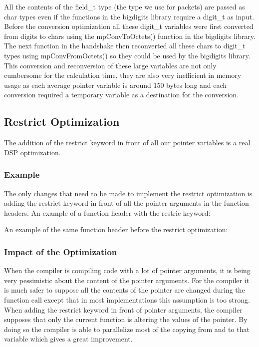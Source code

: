 \documentclass[a4paper]{article}
\begin{document}
All the contents of the field\_t type (the type we use for packets) are passed as char types even if the functions in the bigdigits library require a digit\_t as input. Before the conversion optimization all these digit\_t variables were first converted from digits to chars using the mpConvToOctets() function in the bigdigits library. The next function in the handshake then reconverted all these chars to digit\_t types using mpConvFromOctets() so they could be used by the bigdigits library.\\

This conversion and reconversion of these large variables are not only cumbersome for the calculation time, they are also very inefficient in memory usage as each average pointer variable is around 150 bytes long and each conversion required a temporary variable as a destination for the conversion.\\

\subsection{Restrict Optimization}
The addition of the restrict keyword in front of all our pointer variables is a real DSP optimization.

\subsubsection{Example}
The only changes that need to be made to implement the restrict optimization is adding the restrict keyword in front of all the pointer arguments in the function headers. An example of a function header with the restric keyword:


An example of the same function header before the restrict optimization:



\subsubsection{Impact of the Optimization}
When the compiler is compiling code with a lot of pointer arguments, it is being very pessimistic about the content of the pointer arguments. For the compiler it is much safer to suppose all the contents of the pointer are changed during the function call except that in most implementations this assumption is too strong. When adding the restrict keyword in front of pointer arguments, the compiler supposes that only the current function is altering the values of the pointer. By doing so the compiler is able to parallelize most of the copying from and to that variable which gives a great improvement.\\
\end{document}
